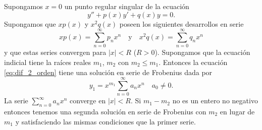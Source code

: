 \documentclass{article}
\begin{document}
\begin{teorema} Supongamos $x=0$ un punto regular singular de la ecuación
\begin{equation}\label{eq:dif_2_orden} y''+p(x)y'+q(x)y=0.
\end{equation}
Supongamos que $xp(x)$ y $x^2q(x)$ poseen los  siguientes desarrollos en serie 
\[xp(x)=\sum_{n=0}^{\infty}p_nx^n\quad\text{y}\quad x^2q(x)=\sum_{n=0}^{\infty}q_nx^n\]
y que estas series convergen para $|x|<R$ ($R>0$). Supongamos que la ecuación indicial tiene la raíces reales $m_1$, $m_2$ con  $m_2\leq m_1$.  Entonces la ecuación \eqref{eq:dif_2_orden}  tiene una solución en serie de Frobenius dada por
\[y_1=x^{m_1}\sum_{n=0}^{\infty}a_nx^n\quad a_0\neq 0.\]
La serie $\sum_{n=0}^{\infty}a_nx^n$ converge en $|x|<R$. Si $m_1-m_2$ no es un entero no negativo entonces tenemos una segunda solución en serie de Frobenius con $m_2$ en lugar de $m_1$ y satisfaciendo las mismas condiciones que la primer serie.  
\end{teorema}
\end{document}
